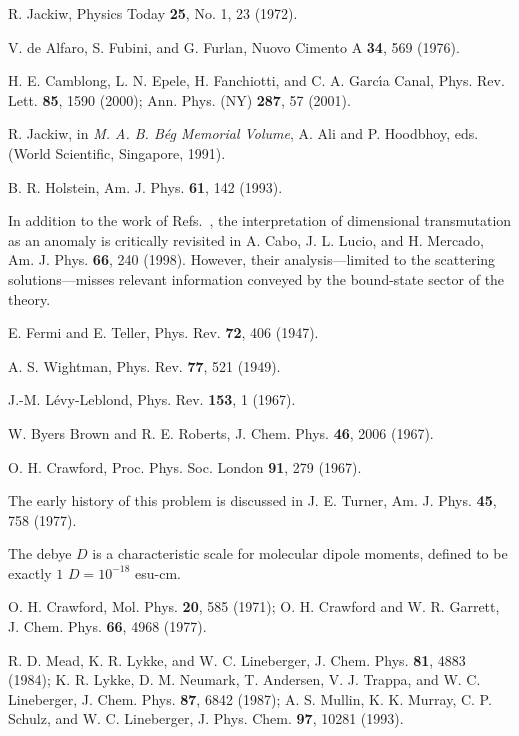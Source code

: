 \documentclass[a4paper,twocolumn,
showpacs,amssymb,aps,prl,superscriptaddress]{revtex4}%
\begin{document}
\begin{thebibliography}{99}
R. Jackiw, Physics Today {\bf 25}, No. 1, 23 (1972).

V. de Alfaro, S. Fubini, and G. Furlan, Nuovo Cimento A {\bf 34},
569 (1976).

H. E. Camblong, L. N. Epele, H. Fanchiotti, and C. A. Garc\'{\i}a
Canal, Phys. Rev. Lett. {\bf 85}, 1590 (2000);
 Ann. Phys. (NY) {\bf 287}, 57 (2001).

R. Jackiw,
in {\em M. A. B. B\'{e}g Memorial Volume\/},
A. Ali and P. Hoodbhoy, eds. (World Scientific, Singapore, 1991).

B. R. Holstein, Am. J. Phys. {\bf 61}, 142 (1993).

In addition to the work of Refs.~\cite{jac:91,hol:93}, the
interpretation of dimensional transmutation as an anomaly is
critically revisited in A. Cabo, J. L. Lucio, and H. Mercado, Am.
J. Phys. {\bf 66}, 240 (1998). However, their analysis---limited
to the scattering solutions---misses relevant information
conveyed by the bound-state sector of the theory.

E. Fermi and E. Teller,
Phys. Rev. {\bf 72}, 406 (1947).

A. S. Wightman,
Phys. Rev. {\bf 77}, 521 (1949).

J.-M. L\'{e}vy-Leblond,
Phys. Rev. {\bf 153}, 1 (1967).

W. Byers Brown and R. E. Roberts, J. Chem. Phys. {\bf 46}, 2006
(1967).

O. H. Crawford,
Proc. Phys. Soc. London {\bf 91},
279 (1967).

The early history of this problem is discussed in J. E. Turner,
Am. J. Phys. {\bf 45}, 758 (1977).

The debye $D$ is a characteristic scale for  molecular dipole
moments, defined to be exactly  $1$ $D = 10^{-18}$ esu-cm.

O. H. Crawford, Mol. Phys. {\bf 20}, 585 (1971); O. H. Crawford
and W. R. Garrett, J. Chem. Phys. {\bf 66}, 4968 (1977).

R. D. Mead, K. R. Lykke, and W. C. Lineberger, J. Chem. Phys.
{\bf 81}, 4883 (1984); K. R. Lykke, D. M. Neumark, T. Andersen, V.
J. Trappa, and W. C. Lineberger, J. Chem. Phys. {\bf 87}, 6842
(1987);
 A. S. Mullin, K. K. Murray, C. P. Schulz,
and W. C. Lineberger, J. Phys. Chem. {\bf 97}, 10281 (1993).


\end{thebibliography}
\end{document}
